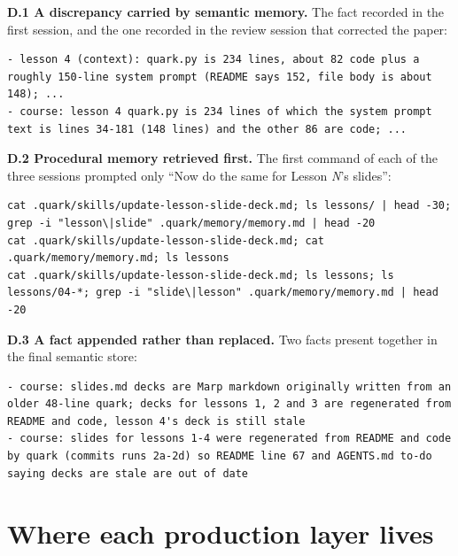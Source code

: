 \textbf{D.1 A discrepancy carried by semantic memory.} The fact recorded in the first session, and the one recorded in the review session that corrected the paper:

\begin{lstlisting}
- lesson 4 (context): quark.py is 234 lines, about 82 code plus a roughly 150-line system prompt (README says 152, file body is about 148); ...
- course: lesson 4 quark.py is 234 lines of which the system prompt text is lines 34-181 (148 lines) and the other 86 are code; ...
\end{lstlisting}

\textbf{D.2 Procedural memory retrieved first.} The first command of each of the three sessions prompted only ``Now do the same for Lesson \emph{N}'s slides'':

\begin{lstlisting}
cat .quark/skills/update-lesson-slide-deck.md; ls lessons/ | head -30; grep -i "lesson\|slide" .quark/memory/memory.md | head -20
cat .quark/skills/update-lesson-slide-deck.md; cat .quark/memory/memory.md; ls lessons
cat .quark/skills/update-lesson-slide-deck.md; ls lessons; ls lessons/04-*; grep -i "slide\|lesson" .quark/memory/memory.md | head -20
\end{lstlisting}

\textbf{D.3 A fact appended rather than replaced.} Two facts present together in the final semantic store:

\begin{lstlisting}
- course: slides.md decks are Marp markdown originally written from an older 48-line quark; decks for lessons 1, 2 and 3 are regenerated from README and code, lesson 4's deck is still stale
- course: slides for lessons 1-4 were regenerated from README and code by quark (commits runs 2a-2d) so README line 67 and AGENTS.md to-do saying decks are stale are out of date
\end{lstlisting}

\section{Where each production layer lives}

